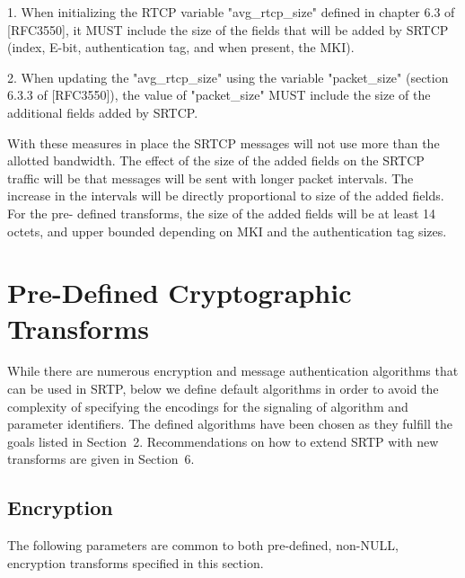 \documentclass{article}
\begin{document}
\begin{itemize}
1. When initializing the RTCP variable "avg\_rtcp\_size" defined in chapter 6.3 of [RFC3550], it MUST include the size of the fields that will be added by SRTCP (index, E-bit, authentication tag, and when present, the MKI).

2. When updating the "avg\_rtcp\_size" using the variable "packet\_size" (section 6.3.3 of [RFC3550]), the value of "packet\_size" MUST include the size of the additional fields added by SRTCP.

With these measures in place the SRTCP messages will not use more than the allotted bandwidth.  The effect of the size of the added fields on the SRTCP traffic will be that messages will be sent with longer packet intervals.  The increase in the intervals will be directly proportional to size of the added fields.  For the pre- defined transforms, the size of the added fields will be at least 14 octets, and upper bounded depending on MKI and the authentication tag sizes.

\end{itemize}
\section{Pre-Defined Cryptographic Transforms}

While there are numerous encryption and message authentication algorithms that can be used in SRTP, below we define default algorithms in order to avoid the complexity of specifying the encodings for the signaling of algorithm and parameter identifiers. The defined algorithms have been chosen as they fulfill the goals listed in Section~2.  Recommendations on how to extend SRTP with new transforms are given in Section~6.

\subsection{Encryption}

The following parameters are common to both pre-defined, non-NULL, encryption transforms specified in this section.
\end{document}
